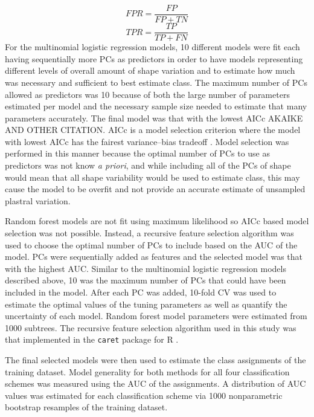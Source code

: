 \documentclass[12pt,letterpaper]{article}\usepackage{graphicx, color}
\begin{document}
\begin{equation}
  FPR = \frac{FP}{FP + TN}
  \label{eq:fpr}
\end{equation}
\begin{equation}
  TPR = \frac{TP}{TP + FN}
  \label{eq:tpr}
\end{equation}
For the multinomial logistic regression models, 10 different models were fit each having sequentially more PCs as predictors in order to have models representing different levels of overall amount of shape variation and to estimate how much was necessary and sufficient to best estimate class. The maximum number of PCs allowed as predictors was 10 because of both the large number of parameters estimated per model and the necessary sample size needed to estimate that many parameters accurately. The final model was that with the lowest AICc \citep{Burnham2002a} AKAIKE AND OTHER CITATION. AICc is a model selection criterion where the model with lowest AICc has the fairest variance--bias tradeoff \citep{Burnham2002a}. Model selection was performed in this manner because the optimal number of PCs to use as predictors was not know \textit{a priori}, and while including all of the PCs of shape would mean that all shape variability would be used to estimate class, this may cause the model to be overfit and not provide an accurate estimate of unsampled plastral variation. 

Random forest models are not fit using maximum likelihood so AICc based model selection was not possible. Instead, a recursive feature selection algorithm was used to choose the optimal number of PCs to include based on the AUC of the model. PCs were sequentially added as features and the selected model was that with the highest AUC. Similar to the multinomial logistic regression models described above, 10 was the maximum number of PCs that could have been included in the model. After each PC was added, 10-fold CV was used to estimate the optimal values of the tuning parameters as well as quantify the uncertainty of each model. Random forest model parameters were estimated from 1000 subtrees. The recursive feature selection algorithm used in this study was that implemented in the \texttt{caret} package for R \citep{Kuhn2013}.

The final selected models were then used to estimate the class assignments of the training dataset. Model generality for both methods for all four classification schemes was measured using the AUC of the assignments. A distribution of AUC values was estimated for each classification scheme via 1000 nonparametric bootstrap resamples of the training dataset.
\end{document}
